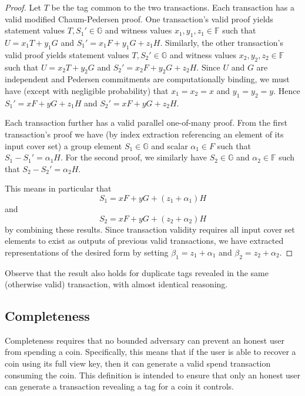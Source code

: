 \documentclass{llncs}
\newcommand{\G}{\mathbb{G}}
\newcommand{\F}{\mathbb{F}}
\begin{document}
\begin{proof}
    Let $T$ be the tag common to the two transactions.
    Each transaction has a valid modified Chaum-Pedersen proof.
    One transaction's valid proof yields statement values $T,S_1' \in \G$ and witness values $x_1,y_1,z_1 \in \F$ such that $U = x_1 T + y_1 G$ and $S_1' = x_1 F + y_1 G + z_1 H$.
    Similarly, the other transaction's valid proof yields statement values $T,S_2' \in \G$ and witness values $x_2,y_2,z_2 \in \F$ such that $U = x_2 T + y_2 G$ and $S_2' = x_2 F + y_2 G + z_2 H$.
    Since $U$ and $G$ are independent and Pedersen commitments are computationally binding, we must have (except with negligible probability) that $x_1 = x_2 = x$ and $y_1 = y_2 = y$.
    Hence $S_1' = xF + yG + z_1 H$ and $S_2' = xF + yG + z_2 H$.

    Each transaction further has a valid parallel one-of-many proof.
    From the first transaction's proof we have (by index extraction referencing an element of its input cover set) a group element $S_1 \in \G$ and scalar $\alpha_1 \in F$ such that $S_1 - S_1' = \alpha_1 H$.
    For the second proof, we similarly have $S_2 \in \G$ and $\alpha_2 \in \F$ such that $S_2 - S_2' = \alpha_2 H$.

    This means in particular that $$S_1 = xF + yG + (z_1 + \alpha_1)H$$ and $$S_2 = xF + yG + (z_2 + \alpha_2)H$$ by combining these results.
    Since transaction validity requires all input cover set elements to exist as outputs of previous valid transactions, we have extracted representations of the desired form by setting $\beta_1 = z_1 + \alpha_1$ and $\beta_2 = z_2 + \alpha_2$.
\end{proof}
Observe that the result also holds for duplicate tags revealed in the same (otherwise valid) transaction, with almost identical reasoning.

\subsection{Completeness}

Completeness requires that no bounded adversary can prevent an honest user from spending a coin.
Specifically, this means that if the user is able to recover a coin using its full view key, then it can generate a valid spend transaction consuming the coin.
This definition is intended to ensure that only an honest user can generate a transaction revealing a tag for a coin it controls.
\end{document}
